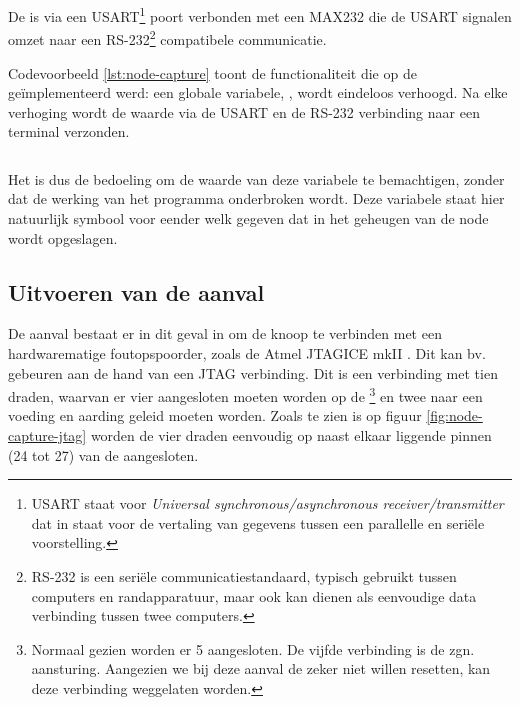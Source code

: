 De \mcu is via een USART\footnote{USART staat voor \emph{Universal
synchronous/asynchronous receiver/transmitter} dat in staat voor de vertaling
van gegevens tussen een parallelle en seri\"ele voorstelling.} poort verbonden
met een MAX232 \citep{datasheet:max232} die de USART signalen omzet naar een
RS-232\footnote{RS-232 is een seri\"ele communicatiestandaard, typisch gebruikt
tussen computers en randapparatuur, maar ook kan dienen als eenvoudige data
verbinding tussen twee computers.} compatibele communicatie.

Codevoorbeeld \ref{lst:node-capture} toont de functionaliteit die op de \mcu
ge\"implementeerd werd: een globale variabele, , wordt eindeloos
verhoogd. Na elke verhoging wordt de waarde via de USART en de RS-232
verbinding naar een terminal verzonden. 

\inputminted[linenos,frame=lines,framesep=2mm,fontsize=\footnotesize]{c}{../src/node-capture/main.c}
\vspace{-5mm}
\vspace{3mm}

Het is dus de bedoeling om de waarde van deze  variabele te
bemachtigen, zonder dat de werking van het programma onderbroken wordt. Deze
variabele staat hier natuurlijk symbool voor eender welk gegeven dat in het
geheugen van de node wordt opgeslagen.

\subsection{Uitvoeren van de aanval}

De aanval bestaat er in dit geval in om de knoop te verbinden met een
hardwarematige foutopspoorder, zoals de Atmel JTAGICE mkII
\citep{manual:jtagicemkii}. Dit kan bv. gebeuren aan de hand van een JTAG
verbinding. Dit is een verbinding met tien draden, waarvan er vier aangesloten
moeten worden op de \mcu\footnote{Normaal gezien worden er 5 aangesloten. De
vijfde verbinding is de zgn.  aansturing. Aangezien we bij deze
aanval de \mcu zeker niet willen resetten, kan deze verbinding weggelaten
worden.} en twee naar een voeding en aarding geleid moeten worden. Zoals te
zien is op figuur \ref{fig:node-capture-jtag} worden de vier draden eenvoudig
op naast elkaar liggende pinnen (24 tot 27) van de \mcu aangesloten.

